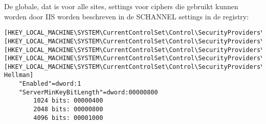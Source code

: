 De globale, dat is voor alle sites, settings voor ciphers die gebruikt kunnen worden door IIS worden beschreven in de SCHANNEL settings in de registry:
\begin{lstlisting}
[HKEY_LOCAL_MACHINE\SYSTEM\CurrentControlSet\Control\SecurityProviders\Schannel\Ciphers]
[HKEY_LOCAL_MACHINE\SYSTEM\CurrentControlSet\Control\SecurityProviders\Schannel\CipherSuites]
[HKEY_LOCAL_MACHINE\SYSTEM\CurrentControlSet\Control\SecurityProviders\Schannel\Hashes]
[HKEY_LOCAL_MACHINE\SYSTEM\CurrentControlSet\Control\SecurityProviders\Schannel\KeyExchangeAlgorithms]
[HKEY_LOCAL_MACHINE\SYSTEM\CurrentControlSet\Control\SecurityProviders\SCHANNEL\KeyExchangeAlgorithms\Diffie-Hellman]
	"Enabled"=dword:1
	"ServerMinKeyBitLength"=dword:00000800
		1024 bits: 00000400
		2048 bits: 00000800
		4096 bits: 00001000
\end{lstlisting}
